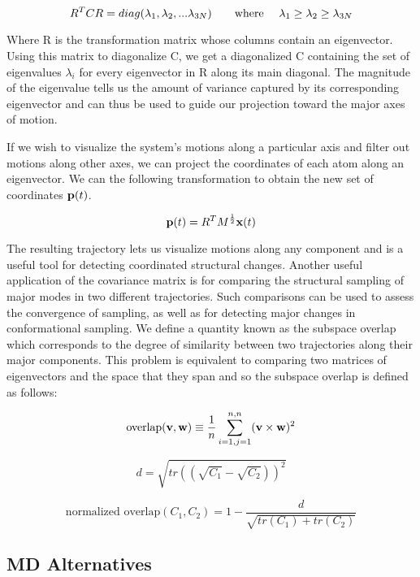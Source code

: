 \begin{equation}
R^{T}CR = diag(\lambda_1, \lambda_2, ... \lambda_{3N}) \text{\qquad where \quad} \lambda_1 \geq \lambda_2 \geq \lambda_{3N}
\end{equation}

Where R is the transformation matrix whose columns contain an eigenvector. Using this matrix to diagonalize C, we get a diagonalized C containing the set of eigenvalues $\lambda_i$ for every eigenvector in R along its main diagonal. The magnitude of the eigenvalue tells us the amount of variance captured by its corresponding eigenvector and can thus be used to guide our projection toward the major axes of motion.

If we wish to visualize the system's motions along a particular axis and filter out motions along other axes, we can project the coordinates of each atom along an eigenvector. We can the following transformation to obtain the new set of coordinates $\mathbf{p}(t)$.

\begin{equation}
\mathbf{p}(t) = R^{T}M^{\frac{1}{2}}\mathbf{x}(t)
\end{equation}

The resulting trajectory lets us visualize motions along any component and is a useful tool for detecting coordinated structural changes. Another useful application of the covariance matrix is for comparing the structural sampling of major modes in two different trajectories. Such comparisons can be used to assess the convergence of sampling, as well as for detecting major changes in conformational sampling. We define a quantity known as the subspace overlap which corresponds to the degree of similarity between two trajectories along their major components. This problem is equivalent to comparing two matrices of eigenvectors and the space that they span and so the subspace overlap is defined as follows:

\begin{equation}
\text{overlap}(\mathbf{v}, \mathbf{w}) \equiv \frac{1}{n} \sum_{i=1, j=1}^{n,n} (\mathbf{v} \times \mathbf{w}) ^ 2
\end{equation}

\begin{equation}
d = \sqrt{tr((\sqrt{C_1} - \sqrt{C_2}))^2}
\end{equation}

\begin{equation}
\text{normalized overlap} (C_1, C_2) = 1 - \frac{d}{\sqrt{tr(C_1) + tr(C_2)}}
\end{equation}













\subsection{MD Alternatives}



